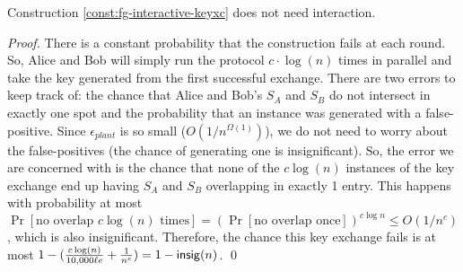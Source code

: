 \begin{lemma}\label{lem:non-interactive-const}
	Construction \ref{const:fg-interactive-keyxc} does not need interaction.
\end{lemma}
\begin{proof}
	There is a constant probability that the construction fails at each round. So, Alice and Bob will simply run the protocol $c\cdot\log(n)$ times in parallel and take the key generated from the first successful exchange. There are two errors to keep track of: the chance that Alice and Bob's $S_A$ and $S_B$ do not intersect in exactly one spot and the probability that an instance was generated with a false-positive. Since $\epsilon_{plant}$ is so small ($O(1/n^{\Omega(1)})$), we do not need to worry about the false-positives (the chance of generating one is insignificant). So, the error we are concerned with is the chance that none of the $c \log(n)$ instances of the key exchange end up having $S_A$ and $S_B$ overlapping in exactly 1 entry. This happens with probability at most $\Pr[\mbox{no overlap } c\log(n) \mbox{ times}] = \left( \Pr[\mbox{no overlap once}] \right)^{c \log n} \leq O(1/n^c)$, which is also insignificant. Therefore, the chance this key exchange fails is at most $1 - (\frac{c\log(n)}{10,000 \ell e} + \frac{1}{n^c}) = 1 - \mathsf{insig}(n)$.
\qed\end{proof}

